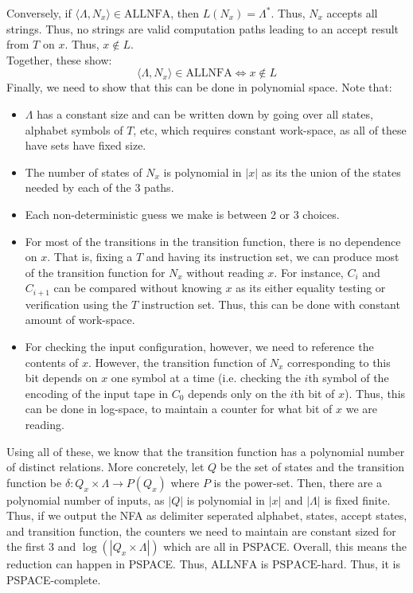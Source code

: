 \documentclass[12pt]{article}
\begin{document}
\begin{solution}
    Conversely, if $\langle \Lambda, N_x \rangle \in \text{ALLNFA}$, then $L(N_x) = \Lambda^*$. Thus, $N_x$ accepts all strings. Thus, no strings are valid computation paths leading to an accept result from $T$ on $x$. Thus, $x \not \in L$. \\
    Together, these show: 
    \[ \langle \Lambda, N_x \rangle \in \text{ALLNFA} \iff x \not \in L \]
    Finally, we need to show that this can be done in polynomial space. Note that: 
    \begin{itemize}
        \item $\Lambda$ has a constant size and can be written down by going over all states, alphabet symbols of $T$, etc, which requires constant work-space, as all of these have sets have fixed size.
        \item The number of states of $N_x$ is polynomial in $|x|$ as its the union of the states needed by each of the 3 paths.
        \item Each non-deterministic guess we make is between 2 or 3 choices. 
        \item For most of the transitions in the transition function, there is no dependence on $x$. That is, fixing a $T$ and having its instruction set, we can produce most of the transition function for $N_x$ without reading $x$. For instance, $C_i$ and $C_{i+1}$ can be compared without knowing $x$ as its either equality testing or verification using the $T$ instruction set. Thus, this can be done with constant amount of work-space. 
        \item For checking the input configuration, however, we need to reference the contents of $x$. However, the transition function of $N_x$ corresponding to this bit depends on $x$ one symbol at a time (i.e. checking the $i$th symbol of the encoding of the input tape in $C_0$ depends only on the $i$th bit of $x$). Thus, this can be done in log-space, to maintain a counter for what bit of $x$ we are reading. 
    \end{itemize}
    Using all of these, we know that the transition function has a polynomial number of distinct relations. More concretely, let $Q$ be the set of states and the transition function be  $\delta : Q_x \times \Lambda \to P(Q_x)$ where $P$ is the power-set. Then, there are a polynomial number of inputs, as $|Q|$ is polynomial in $|x|$ and $|\Lambda|$ is fixed finite. Thus, if we output the NFA as delimiter seperated alphabet, states, accept states, and transition function, the counters we need to maintain are constant sized for the first $3$ and $\log(|Q_x \times \Lambda|)$ which are all in PSPACE. \bbni
    Overall, this means the reduction can happen in PSPACE. Thus, $\text{ALLNFA}$ is $\text{PSPACE}$-hard. Thus, it is PSPACE-complete.
\end{solution}
\end{document}
